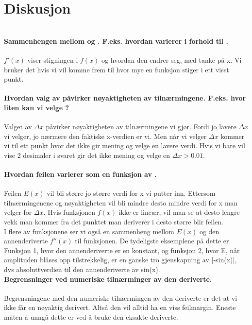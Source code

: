 \chapter{Diskusjon} \\
\textbullet \textbf{Sammenhengen mellom  og . F.eks. hvordan  varierer i forhold til .}\\
\\
$f'(x)$ viser stigningen i $f(x)$ og hvordan den endrer seg, med tanke på x. Vi bruker det hvis vi vil komme frem til hvor mye en funksjon stiger i ett visst punkt. \\
\\
\textbullet \textbf{Hvordan valg av  påvirker nøyaktigheten av tilnærmingene. F.eks. hvor liten kan vi velge  ?\\}
\\
Valget av  $\Delta x$ påvirker nøyaktigheten av tilnærmingene vi gjør. Fordi jo lavere $\Delta x$ vi velger, jo nærmere den faktiske x-verdien er vi. Men når vi velger $\Delta x$ kommer vi til ett punkt hvor det ikke gir mening og velge en lavere verdi. Hvis vi bare vil vise 2 desimaler i svaret gir det ikke mening og velge en $\Delta x > 0.01$.\\
\\
\textbullet \textbf{Hvordan feilen  varierer som en funksjon av .\\}
\\
Feilen $E(x)$ vil bli større jo større verdi for x vi putter inn. Ettersom tilnærmingenene og nøyaktigheten vil bli mindre desto mindre verdi for x man velger for $\Delta x$. Hvis funksjonen $f(x)$ ikke er lineær, vil man se at desto lengre vekk man kommer fra det punktet man deriverer i desto større blir feilen.\\ I flere av funksjonene ser vi også en sammenheng mellom $E(x)$ og den annenderiverte $f''(x)$ til funksjonen. De tydeligste eksemplene på dette er Funksjon 1, hvor den annenderiverte er en konstant, og funksjon 2, hvor E, når amplituden blåses opp tilstrekkelig, er en ganske tro gjenskapning av |-sin(x)|, dvs absoluttverdien til den annenderiverte av sin(x).
\\
\textbullet \textbf{Begrensninger ved numeriske tilnærminger av den deriverte.\\}
\\
Begrensningene med den numeriske tilnærmingen av den deriverte er det at vi ikke får en nøyaktig derivert. Altså den vil alltid ha en viss feilmargin. Eneste måten å unngå dette er ved å bruke den eksakte deriverte. \\
